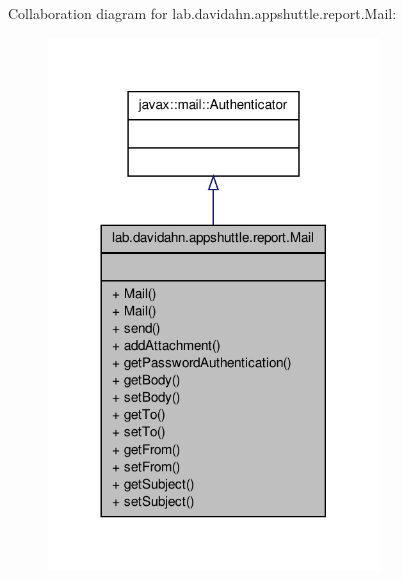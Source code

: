 \-Collaboration diagram for lab.\-davidahn.\-appshuttle.\-report.\-Mail\-:
\nopagebreak
\begin{figure}[H]
\begin{center}
\leavevmode
\includegraphics[width=248pt]{classlab_1_1davidahn_1_1appshuttle_1_1report_1_1_mail__coll__graph}
\end{center}
\end{figure}
